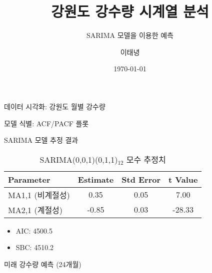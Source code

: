 \documentclass{beamer}
\title{강원도 강수량 시계열 분석}
\subtitle{SARIMA 모델을 이용한 예측}
\author{이태녕}
\date{\today}
\begin{document}
\begin{frame}
    \titlepage
\end{frame}

\begin{frame}{데이터 시각화: 강원도 월별 강수량}
\end{frame}


\begin{frame}{모델 식별: ACF/PACF 플롯}
\end{frame}

\begin{frame}{SARIMA 모델 추정 결과}
    \begin{table}
        \centering
        \caption{SARIMA(0,0,1)(0,1,1)\(_ {12}\) 모수 추정치}
        \begin{tabular}{|l|c|c|c|}
            \hline
            \textbf{Parameter} & \textbf{Estimate} & \textbf{Std Error} & \textbf{t Value} \\
            \hline
            MA1,1 (비계절성) & 0.35 & 0.05 & 7.00 \\
            MA2,1 (계절성) & -0.85 & 0.03 & -28.33 \\
            \hline
        \end{tabular}
        \medskip
        \begin{itemize}
            \item AIC: 4500.5
            \item SBC: 4510.2
        \end{itemize}
    \end{table}
\end{frame}

\begin{frame}{미래 강수량 예측 (24개월)}
\end{frame}
\end{document}
